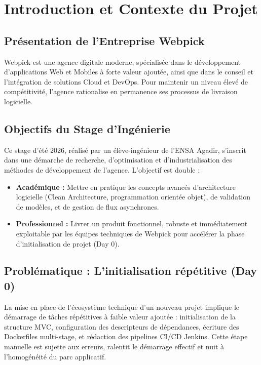 \documentclass[12pt,a4paper]{article}
\begin{document}
\newpage
\thispagestyle{empty}
\tableofcontents
\newpage

\section{Introduction et Contexte du Projet}

\subsection{Présentation de l'Entreprise Webpick}
Webpick est une agence digitale moderne, spécialisée dans le développement d'applications Web et Mobiles à forte valeur ajoutée, ainsi que dans le conseil et l'intégration de solutions Cloud et DevOps. Pour maintenir un niveau élevé de compétitivité, l'agence rationalise en permanence ses processus de livraison logicielle.

\subsection{Objectifs du Stage d'Ingénierie}
Ce stage d'été 2026, réalisé par un élève-ingénieur de l'ENSA Agadir, s'inscrit dans une démarche de recherche, d'optimisation et d'industrialisation des méthodes de développement de l'agence. L'objectif est double :
\begin{itemize}[label=\textcolor{primary}{\textbullet}]
    \item \textbf{Académique :} Mettre en pratique les concepts avancés d'architecture logicielle (Clean Architecture, programmation orientée objet), de validation de modèles, et de gestion de flux asynchrones.
    \item \textbf{Professionnel :} Livrer un produit fonctionnel, robuste et immédiatement exploitable par les équipes techniques de Webpick pour accélérer la phase d'initialisation de projet (Day 0).
\end{itemize}

\subsection{Problématique : L'initialisation répétitive (Day 0)}
La mise en place de l'écosystème technique d'un nouveau projet implique le démarrage de tâches répétitives à faible valeur ajoutée : initialisation de la structure MVC, configuration des descripteurs de dépendances, écriture des Dockerfiles multi-stage, et rédaction des pipelines CI/CD Jenkins. Cette étape manuelle est sujette aux erreurs, ralentit le démarrage effectif et nuit à l'homogénéité du parc applicatif.
\end{document}
